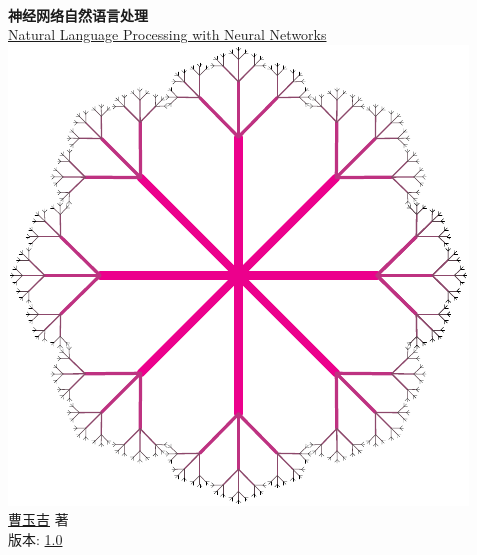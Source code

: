 \documentclass[twoside,a4paper,12pt]{book}%
\begin{document}
\begin{titlepage}
	\begin{center}
		\hfill\\
		\vspace{1cm}
		{\fontsize{36pt}{44pt}\bfseries 神经网络自然语言处理}\\
		\vspace{1em}
		{\LARGE\href{http://neuralnetworksanddeeplearning.com/index.html}{Natural Language Processing with Neural Networks}}\\
		\vspace{1cm}
		\includegraphics[width=0.99\linewidth]{cayley}\\
		\vspace{1cm}
		{\LARGE \href{http://michaelnielsen.org/}{曹玉吉} 著}\\
		\vspace{1cm}
		\vfill
		\vfill
		\vfill
		\vspace{1em}
		{\large 版本: \href{https://github.com/zhanggyb/nndl/releases/tag/0.5}{1.0}}
	\end{center}
\end{titlepage}
\end{document}
